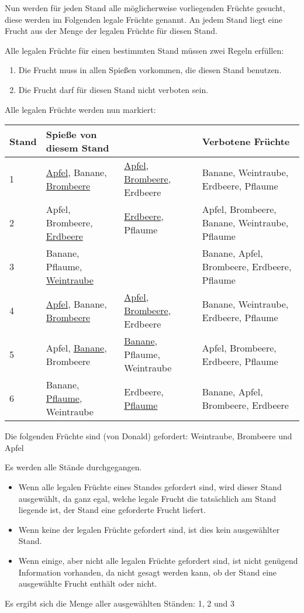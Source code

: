 \documentclass[a4paper,10pt,ngerman]{scrartcl}
\begin{document}
Nun werden für jeden Stand alle möglicherweise vorliegenden Früchte gesucht, diese werden im Folgenden legale Früchte genannt.
An jedem Stand liegt eine Frucht aus der Menge der legalen Früchte für diesen Stand.

Alle legalen Früchte für einen bestimmten Stand müssen zwei Regeln erfüllen:
\begin{enumerate}
    \item Die Frucht muss in allen Spießen vorkommen, die diesen Stand benutzen.
    \item Die Frucht darf für diesen Stand nicht verboten sein.
\end{enumerate}
Alle legalen Früchte werden nun markiert:

\begin{center}
\begin{tabularx}{\linewidth}{l|X|X|X}
    \textbf{Stand} & \textbf{Spieße von diesem Stand} & & \textbf{Verbotene Früchte} \\
    \hline
    1 & \underline{Apfel}, Banane, \underline{Brombeere} & \underline{Apfel}, \underline{Brombeere}, Erdbeere & Banane, Weintraube, Erdbeere, Pflaume \\
    \hline
    2 & Apfel, Brombeere, \underline{Erdbeere} & \underline{Erdbeere}, Pflaume & Apfel, Brombeere, Banane, Weintraube, Pflaume \\
    \hline
    3 & Banane, Pflaume, \underline{Weintraube} & & Banane, Apfel, Brombeere, Erdbeere, Pflaume \\
    \hline
    4 & \underline{Apfel}, Banane, \underline{Brombeere} & \underline{Apfel}, \underline{Brombeere}, Erdbeere & Banane, Weintraube, Erdbeere, Pflaume \\
    \hline
    5 & Apfel, \underline{Banane}, Brombeere & \underline{Banane}, Pflaume, Weintraube & Apfel, Brombeere, Erdbeere, Pflaume \\
    \hline
    6 & Banane, \underline{Pflaume}, Weintraube & Erdbeere, \underline{Pflaume} & Banane, Apfel, Brombeere, Erdbeere
\end{tabularx}
\end{center}

Die folgenden Früchte sind (von Donald) gefordert: Weintraube, Brombeere und Apfel

Es werden alle Stände durchgegangen.
\begin{itemize}
    \item Wenn alle legalen Früchte eines Standes gefordert sind, wird dieser Stand ausgewählt, da ganz egal, welche legale Frucht die tatsächlich am Stand liegende ist, der Stand eine geforderte Frucht liefert.
    \item Wenn keine der legalen Früchte gefordert sind, ist dies kein ausgewählter Stand.
    \item Wenn einige, aber nicht alle legalen Früchte gefordert sind, ist nicht genügend Information vorhanden, da nicht gesagt werden kann, ob der Stand eine ausgewählte Frucht enthält oder nicht.
\end{itemize}
Es ergibt sich die Menge aller ausgewählten Ständen: 1, 2 und 3
\end{document}
